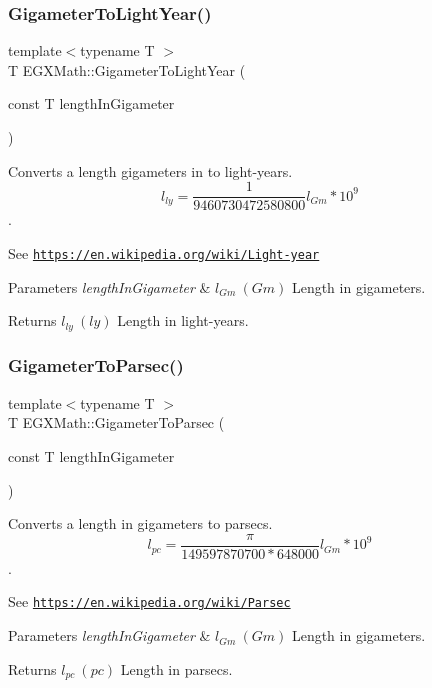 \subsubsection{\texorpdfstring{Gigameter\+To\+Light\+Year()}{GigameterToLightYear()}}
{\footnotesize\ttfamily template$<$typename T $>$ \\
T E\+G\+X\+Math\+::\+Gigameter\+To\+Light\+Year (\begin{DoxyParamCaption}\item[{const T}]{length\+In\+Gigameter }\end{DoxyParamCaption})}



Converts a length gigameters in to light-\/years. \[ l_{ly}= \frac{1}{9460730472580800} l_{Gm} * 10^{9} \]. 

See \href{https://en.wikipedia.org/wiki/Light-year}{\tt https\+://en.\+wikipedia.\+org/wiki/\+Light-\/year} 
\begin{DoxyParams}{Parameters}
{\em length\+In\+Gigameter} & $ l_{Gm}\ (Gm)$ Length in gigameters. \\
\hline
\end{DoxyParams}
\begin{DoxyReturn}{Returns}
$ l_{ly}\ (ly)$ Length in light-\/years. 
\end{DoxyReturn}
\mbox{\label{group___e_g_x_math-_conversions-_length_conversions-_gigameter-_astronomical_ga5a83442adf1a2b81447b7355527f5ec4}} 
\subsubsection{\texorpdfstring{Gigameter\+To\+Parsec()}{GigameterToParsec()}}
{\footnotesize\ttfamily template$<$typename T $>$ \\
T E\+G\+X\+Math\+::\+Gigameter\+To\+Parsec (\begin{DoxyParamCaption}\item[{const T}]{length\+In\+Gigameter }\end{DoxyParamCaption})}



Converts a length in gigameters to parsecs. \[ l_{pc}=\frac{\pi}{149597870700 * 648000} l_{Gm} * 10^{9} \]. 

See \href{https://en.wikipedia.org/wiki/Parsec}{\tt https\+://en.\+wikipedia.\+org/wiki/\+Parsec} 
\begin{DoxyParams}{Parameters}
{\em length\+In\+Gigameter} & $ l_{Gm}\ (Gm)$ Length in gigameters. \\
\hline
\end{DoxyParams}
\begin{DoxyReturn}{Returns}
$ l_{pc}\ (pc)$ Length in parsecs. 
\end{DoxyReturn}
